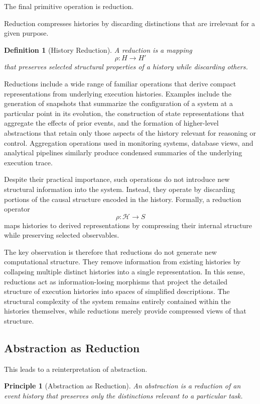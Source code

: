 \documentclass[12pt]{article}
\newtheorem{definition}{Definition}
\newtheorem{principle}{Principle}
\begin{document}
The final primitive operation is reduction.

Reduction compresses histories by discarding distinctions
that are irrelevant for a given purpose.

\begin{definition}[History Reduction]
A reduction is a mapping
\[
\rho : H \rightarrow H'
\]
that preserves selected structural properties of a history
while discarding others.
\end{definition}

Reductions include a wide range of familiar operations that
derive compact representations from underlying execution
histories. Examples include the generation of snapshots that
summarize the configuration of a system at a particular point
in its evolution, the construction of state representations
that aggregate the effects of prior events, and the formation
of higher-level abstractions that retain only those aspects
of the history relevant for reasoning or control. Aggregation
operations used in monitoring systems, database views, and
analytical pipelines similarly produce condensed summaries of
the underlying execution trace.

Despite their practical importance, such operations do not
introduce new structural information into the system. Instead,
they operate by discarding portions of the causal structure
encoded in the history. Formally, a reduction operator
\[
\rho : \mathcal{H} \rightarrow S
\]
maps histories to derived representations by compressing
their internal structure while preserving selected
observables.

The key observation is therefore that reductions do not
generate new computational structure. They remove information
from existing histories by collapsing multiple distinct
histories into a single representation. In this sense,
reductions act as information-losing morphisms that project
the detailed structure of execution histories into spaces
of simplified descriptions. The structural complexity of the
system remains entirely contained within the histories
themselves, while reductions merely provide compressed views
of that structure.

\subsection{Abstraction as Reduction}

This leads to a reinterpretation of abstraction.

\begin{principle}[Abstraction as Reduction]
An abstraction is a reduction of an event history that preserves
only the distinctions relevant to a particular task.
\end{principle}
\end{document}
